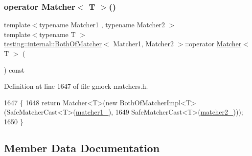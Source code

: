 \mbox{\label{classtesting_1_1internal_1_1BothOfMatcher_a5846390364b763fbe31fb11f8c2e3180}} 
\subsubsection{\texorpdfstring{operator Matcher$<$ T $>$()}{operator Matcher< T >()}}
{\footnotesize\ttfamily template$<$typename Matcher1 , typename Matcher2 $>$ \\
template$<$typename T $>$ \\
\hyperlink{classtesting_1_1internal_1_1BothOfMatcher}{testing\+::internal\+::\+Both\+Of\+Matcher}$<$ Matcher1, Matcher2 $>$\+::operator \hyperlink{classtesting_1_1Matcher}{Matcher}$<$ T $>$ (\begin{DoxyParamCaption}{ }\end{DoxyParamCaption}) const\hspace{0.3cm}{\ttfamily [inline]}}



Definition at line 1647 of file gmock-\/matchers.\+h.


\begin{DoxyCode}
1647                               \{
1648     \textcolor{keywordflow}{return} Matcher<T>(\textcolor{keyword}{new} BothOfMatcherImpl<T>(SafeMatcherCast<T>(\hyperlink{classtesting_1_1internal_1_1BothOfMatcher_a7aeed14276f48d927300a3e2ab23f702}{matcher1\_}),
1649                                                SafeMatcherCast<T>(\hyperlink{classtesting_1_1internal_1_1BothOfMatcher_a531d417ec0480876070ce9da6e0f71ae}{matcher2\_})));
1650   \}
\end{DoxyCode}


\subsection{Member Data Documentation}
\mbox{\label{classtesting_1_1internal_1_1BothOfMatcher_a7aeed14276f48d927300a3e2ab23f702}} 
